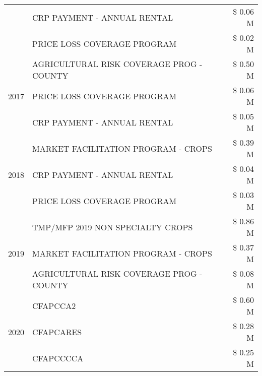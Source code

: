 \begin{tabular}{llr}
 & CRP PAYMENT - ANNUAL RENTAL & \$ 0.06 M \\
 & PRICE LOSS COVERAGE PROGRAM & \$ 0.02 M \\
\cline{1-3}
\multirow[t]{3}{*}{2017} & AGRICULTURAL RISK COVERAGE PROG - COUNTY & \$ 0.50 M \\
 & PRICE LOSS COVERAGE PROGRAM & \$ 0.06 M \\
 & CRP PAYMENT - ANNUAL RENTAL & \$ 0.05 M \\
\cline{1-3}
\multirow[t]{3}{*}{2018} & MARKET FACILITATION PROGRAM - CROPS & \$ 0.39 M \\
 & CRP PAYMENT - ANNUAL RENTAL & \$ 0.04 M \\
 & PRICE LOSS COVERAGE PROGRAM & \$ 0.03 M \\
\cline{1-3}
\multirow[t]{3}{*}{2019} & TMP/MFP 2019 NON SPECIALTY CROPS & \$ 0.86 M \\
 & MARKET FACILITATION PROGRAM - CROPS & \$ 0.37 M \\
 & AGRICULTURAL RISK COVERAGE PROG - COUNTY & \$ 0.08 M \\
\cline{1-3}
\multirow[t]{3}{*}{2020} & CFAPCCA2 & \$ 0.60 M \\
 & CFAPCARES & \$ 0.28 M \\
 & CFAPCCCCA & \$ 0.25 M \\
\cline{1-3}
\bottomrule
\end{tabular}
